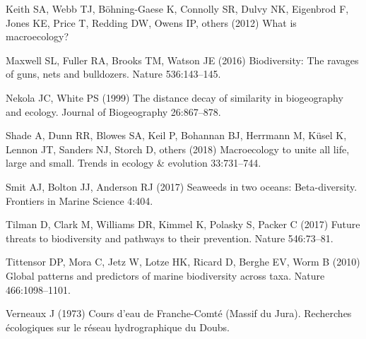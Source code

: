 \documentclass[
  11pt,
]{book}
\newlength{\cslhangindent}
\newenvironment{CSLReferences}[2] %
 {\begin{list}{}{%
  \setlength{\itemindent}{0pt}
  \setlength{\leftmargin}{0pt}
  \setlength{\parsep}{0pt}
  \ifodd #1
   \setlength{\leftmargin}{\cslhangindent}
   \setlength{\itemindent}{-1\cslhangindent}
  \fi
  \setlength{\itemsep}{#2\baselineskip}}}
 {\end{list}}
\begin{document}
\begin{CSLReferences}{1}{1}
Keith SA, Webb TJ, Böhning-Gaese K, Connolly SR, Dulvy NK, Eigenbrod F,
Jones KE, Price T, Redding DW, Owens IP, others (2012) What is
macroecology?

Maxwell SL, Fuller RA, Brooks TM, Watson JE (2016) Biodiversity: The
ravages of guns, nets and bulldozers. Nature 536:143--145.

Nekola JC, White PS (1999) The distance decay of similarity in
biogeography and ecology. {Journal of Biogeography} 26:867--878.

Shade A, Dunn RR, Blowes SA, Keil P, Bohannan BJ, Herrmann M, Küsel K,
Lennon JT, Sanders NJ, Storch D, others (2018) Macroecology to unite all
life, large and small. Trends in ecology \& evolution 33:731--744.

Smit AJ, Bolton JJ, Anderson RJ (2017) Seaweeds in two oceans:
Beta-diversity. {Frontiers in Marine Science} 4:404.

Tilman D, Clark M, Williams DR, Kimmel K, Polasky S, Packer C (2017)
Future threats to biodiversity and pathways to their prevention. Nature
546:73--81.

Tittensor DP, Mora C, Jetz W, Lotze HK, Ricard D, Berghe EV, Worm B
(2010) Global patterns and predictors of marine biodiversity across
taxa. Nature 466:1098--1101.

Verneaux J (1973) Cours d'eau de {F}ranche-{C}omt{é} ({M}assif du
{J}ura). Recherches {é}cologiques sur le r{é}seau hydrographique du
{D}oubs.

\end{CSLReferences}


\backmatter
\end{document}
